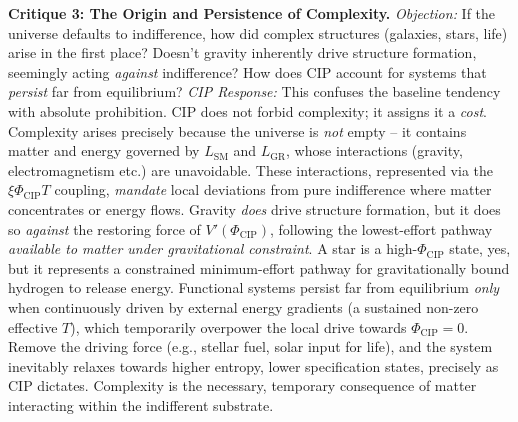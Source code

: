 \documentclass[11pt, a4paper]{article}
\newcommand{\subt}[1]{\mathrm{#1}}
\begin{document}
\textbf{Critique 3: The Origin and Persistence of Complexity.}
\textit{Objection:} If the universe defaults to indifference, how did complex structures (galaxies, stars, life) arise in the first place? Doesn't gravity inherently drive structure formation, seemingly acting \textit{against} indifference? How does CIP account for systems that \textit{persist} far from equilibrium?
\textit{CIP Response:} This confuses the baseline tendency with absolute prohibition. CIP does not forbid complexity; it assigns it a \textit{cost}. Complexity arises precisely because the universe is \textit{not} empty – it contains matter and energy governed by $L_{\subt{SM}}$ and $L_{\subt{GR}}$, whose interactions (gravity, electromagnetism etc.) are unavoidable. These interactions, represented via the $\xi\Phi_{\subt{CIP}}T$ coupling, \textit{mandate} local deviations from pure indifference where matter concentrates or energy flows. Gravity \textit{does} drive structure formation, but it does so \textit{against} the restoring force of $V'(\Phi_{\subt{CIP}})$, following the lowest-effort pathway \textit{available to matter under gravitational constraint}. A star is a high-$\Phi_{\subt{CIP}}$ state, yes, but it represents a constrained minimum-effort pathway for gravitationally bound hydrogen to release energy. Functional systems persist far from equilibrium \textit{only} when continuously driven by external energy gradients (a sustained non-zero effective $T$), which temporarily overpower the local drive towards $\Phi_{\subt{CIP}}=0$. Remove the driving force (e.g., stellar fuel, solar input for life), and the system inevitably relaxes towards higher entropy, lower specification states, precisely as CIP dictates. Complexity is the necessary, temporary consequence of matter interacting within the indifferent substrate.
\end{document}
